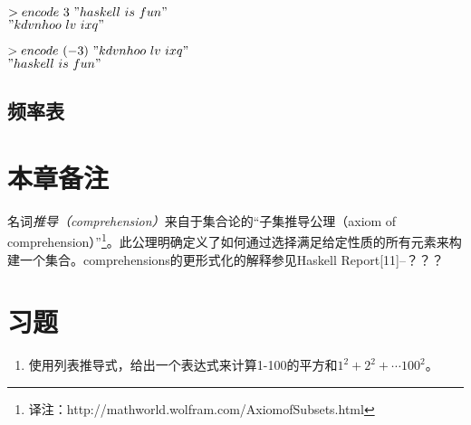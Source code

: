 \noindent\hspace*{1cm}$>encode~3~"haskell~is~fun"$\\
\hspace*{1cm}$"kdvnhoo~lv~ixq"$

\noindent\hspace*{1cm}$>encode~(-3)~"kdvnhoo~lv~ixq"$\\
\hspace*{1cm}$"haskell~is~fun"$

\subsection{频率表}

\section{本章备注}
名词\textit{推导（comprehension）}来自于集合论的“子集推导公理（axiom of comprehension）”\footnote{译注：http://mathworld.wolfram.com/AxiomofSubsets.html}。此公理明确定义了如何通过选择满足给定性质的所有元素来构建一个集合。comprehensions的更形式化的解释参见Haskell Report[11]--？？？

\section{习题}

\begin{enumerate}
  \item 使用列表推导式，给出一个表达式来计算1-100的平方和$1^2 + 2^2 +\cdots 100^2$。
\end{enumerate}






